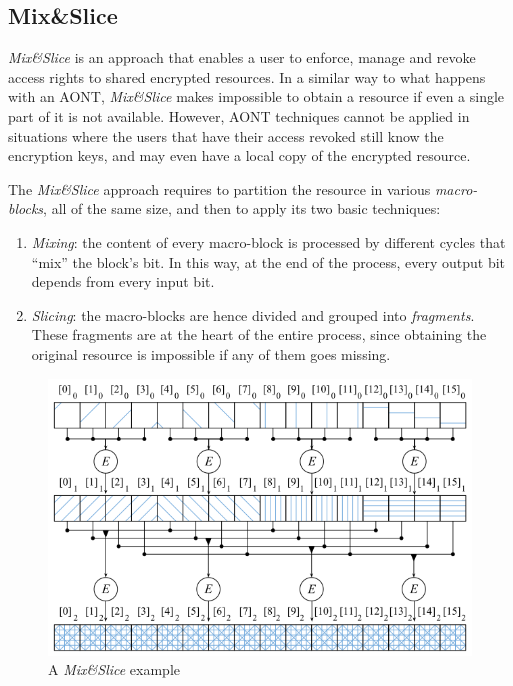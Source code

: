 \documentclass[a4paper,12pt,twoside,openright]{report}
\begin{document}
  \subsection{Mix\&Slice}

  \textit{Mix\&Slice} \cite{mixslice} is an approach that enables a user to enforce, manage and revoke access rights to shared encrypted resources.
  In a similar way to what happens with an AONT, \textit{Mix\&Slice} makes impossible to obtain a resource
  if even a single part of it is not available.
  However, AONT techniques cannot be applied in situations where the users that have their access revoked still know
  the encryption keys, and may even have a local copy of the encrypted resource.

  The \textit{Mix\&Slice} approach requires to partition the resource in various \textit{macro-blocks}, all of the same size,
  and then to apply its two basic techniques:
  \begin{enumerate}
    \item \textit{Mixing}: the content of every macro-block is processed by different cycles that ``mix'' the block's bit.
          In this way, at the end of the process, every output bit depends from every input bit.
    \item \textit{Slicing}: the macro-blocks are hence divided and grouped into \textit{fragments}. These fragments are at the
          heart of the entire process, since obtaining the original resource is impossible if any of them goes missing.
  \end{enumerate}

  \begin{figure}[h!]
    \centering
    \includegraphics[width=0.7\linewidth]{images/mix_slice_example.png}
    \caption{A \textit{Mix\&Slice} example}
  \end{figure}

\end{document}
